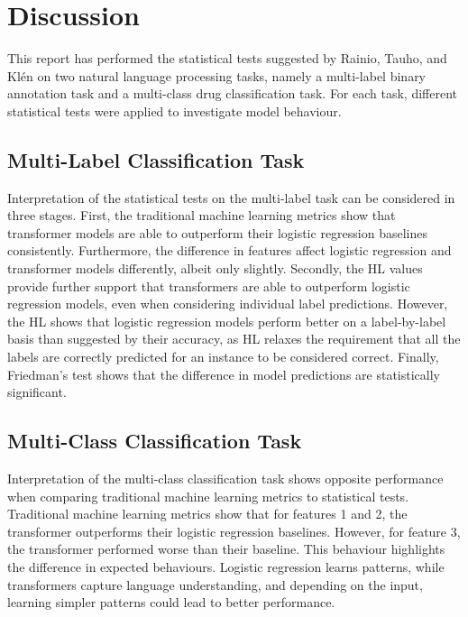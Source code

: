 \documentclass[10.7pt, onecolumn]{article}
\begin{document}
\section{Discussion}\label{discussion and conclusion}
This report has performed the statistical tests suggested by Rainio, Tauho, and Klén\cite{statsBased} on two natural language processing tasks, namely a multi-label binary annotation task and a multi-class drug classification task. For each task, different statistical tests were applied to investigate model behaviour. 

\subsection{Multi-Label Classification Task}
Interpretation of the statistical tests on the multi-label task can be considered in three stages. First, the traditional machine learning metrics show that transformer models are able to outperform their logistic regression baselines consistently. Furthermore, the difference in features affect logistic regression and transformer models differently, albeit only slightly. Secondly, the HL values provide further support that transformers are able to outperform logistic regression models, even when considering individual label predictions. However, the HL shows that logistic regression models perform better on a label-by-label basis than suggested by their accuracy, as HL relaxes the requirement that all the labels are correctly predicted for an instance to be considered correct. Finally, Friedman's test shows that the difference in model predictions are statistically significant.


\subsection{Multi-Class Classification Task}

Interpretation of the multi-class classification task shows opposite performance when comparing traditional machine learning metrics to statistical tests. Traditional machine learning metrics show that for features 1 and 2, the transformer outperforms their logistic regression baselines. However, for feature 3, the transformer performed worse than their baseline. This behaviour highlights the difference in expected behaviours. Logistic regression learns patterns, while transformers capture language understanding, and depending on the input, learning simpler patterns could lead to better performance. 
\end{document}
